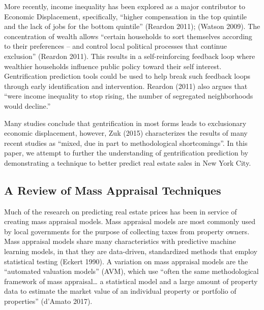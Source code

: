 \documentclass[12pt,]{article}
\begin{document}
More recently, income inequality has been explored as a major
contributor to Economic Displacement, specifically, ``higher
compensation in the top quintile and the lack of jobs for the bottom
quintile'' (Reardon 2011); (Watson 2009). The concentration of wealth
allows ``certain households to sort themselves according to their
preferences -- and control local political processes that continue
exclusion'' (Reardon 2011). This results in a self-reinforcing feedback
loop where wealthier households influence public policy toward their
self interest. Gentrification prediction tools could be used to help
break such feedback loops through early identification and intervention.
Reardon (2011) also argues that ``were income inequality to stop rising,
the number of segregated neighborhoods would decline.''

Many studies conclude that gentrification in most forms leads to
exclusionary economic displacement, however, Zuk (2015) characterizes
the results of many recent studies as ``mixed, due in part to
methodological shortcomings''. In this paper, we attempt to further the
understanding of gentrification prediction by demonstrating a technique
to better predict real estate sales in New York City.

\subsection{A Review of Mass Appraisal
Techniques}\label{a-review-of-mass-appraisal-techniques}

Much of the research on predicting real estate prices has been in
service of creating mass appraisal models. Mass appraisal models are
most commonly used by local governments for the purpose of collecting
taxes from property owners. Mass appraisal models share many
characteristics with predictive machine learning models, in that they
are data-driven, standardized methods that employ statistical testing
(Eckert 1990). A variation on mass appraisal models are the ``automated
valuation models'' (AVM), which use ``often the same methodological
framework of mass appraisal\ldots{} a statistical model and a large
amount of property data to estimate the market value of an individual
property or portfolio of properties'' (d'Amato 2017).
\end{document}
